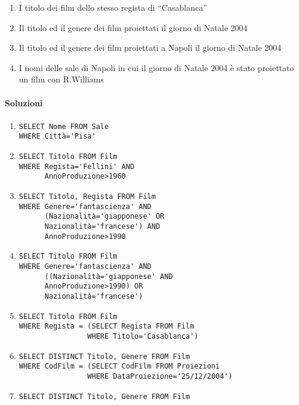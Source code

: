\documentclass[a4paper]{article}
\begin{document}
\begin{enumerate}
\begin{enumerate}
\item I titolo dei film dello stesso regista di “Casablanca”
\item Il titolo ed  il genere dei film proiettati il giorno di Natale 2004
\item  Il titolo ed  il genere dei film proiettati a Napoli il giorno di Natale 2004
\item  I nomi delle sale di Napoli in cui  il giorno di Natale 2004 è stato proiettato un film con R.Williams
\end{enumerate}\par \paragraph{Soluzioni}
\begin{enumerate}
\item
\begin{verbatim}
SELECT Nome FROM Sale
WHERE Città='Pisa'
\end{verbatim}
\item
\begin{verbatim}
SELECT Titolo FROM Film
WHERE Regista='Fellini' AND
      AnnoProduzione>1960
\end{verbatim}
\item
\begin{verbatim}
SELECT Titolo, Regista FROM Film
WHERE Genere='fantascienza' AND
      (Nazionalità='giapponese' OR
      Nazionalità='francese') AND
      AnnoProduzione>1990
\end{verbatim}
\item
\begin{verbatim}
SELECT Titolo FROM Film
WHERE Genere='fantascienza' AND
      ((Nazionalità='giapponese' AND
      AnnoProduzione>1990) OR
      Nazionalità='francese')
\end{verbatim}
\item
\begin{verbatim}
SELECT Titolo FROM Film
WHERE Regista = (SELECT Regista FROM Film
                WHERE Titolo='Casablanca')
\end{verbatim}
\item
\begin{verbatim}
SELECT DISTINCT Titolo, Genere FROM Film
WHERE CodFilm = (SELECT CodFilm FROM Proiezioni
                WHERE DataProiezione='25/12/2004')
\end{verbatim}
\item
\begin{verbatim}
SELECT DISTINCT Titolo, Genere FROM Film

\end{verbatim}
\end{enumerate}
\end{enumerate}
\end{document}
